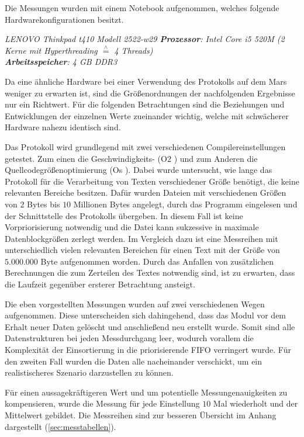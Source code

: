 \label{subCap:Messreihen}

Die Messungen wurden mit einem Notebook aufgenommen, welches
folgende Hardwarekonfigurationen besitzt.

\textit{
	LENOVO Thinkpad t410 Modell 2522-w29 \newline
	\textbf{Prozessor}: Intel Core i5 520M (2 Kerne mit Hyperthreading $\stackrel{\wedge}=$ 4 Threads)\\
	\textbf{Arbeitsspeicher}: 4 GB DDR3	
	}

Da eine ähnliche Hardware bei einer Verwendung des Protokolls auf dem Mars
weniger zu erwarten ist, sind die Größenordnungen der nachfolgenden Ergebnisse
nur ein Richtwert. Für die folgenden Betrachtungen sind die Beziehungen und
Entwicklungen der einzelnen Werte zueinander wichtig, welche mit schwächerer
Hardware nahezu identisch sind.

Das Protokoll wird grundlegend mit zwei verschiedenen
Compilereinstellungen getestet. Zum einen die Geschwindigkeits- (\glqq O$2$
\grqq) und zum Anderen die Quellcodegrößenoptimierung (\glqq Os \grqq). Dabei
wurde untersucht, wie lange das Protokoll für die Verarbeitung von Texten
verschiedener Größe benötigt, die keine relevanten Bereiche besitzen. Dafür
wurden Dateien mit verschiedenen Größen von $2$ Bytes bis $10$ Millionen Bytes 
angelegt, durch das Programm eingelesen und der Schnittstelle des Protokolls
übergeben. In diesem Fall ist keine Vorpriorisierung notwendig und die Datei
kann sukzessive in maximale Datenblockgrößen zerlegt werden.
Im Vergleich dazu ist eine Messreihen mit unterschiedlich vielen relevanten
Bereichen für einen Text mit der Größe von $5.000.000$ Byte aufgenommen
worden.
Durch das Anfallen von zusätzlichen Berechnungen die zum Zerteilen 
des Textes notwendig sind, ist zu erwarten, dass die Laufzeit gegenüber
ersterer Betrachtung ansteigt.

Die eben vorgestellten Messungen wurden auf zwei verschiedenen Wegen
aufgenommen. Diese unterscheiden sich dahingehend, dass das Modul vor dem Erhalt
neuer Daten gelöscht und anschließend neu erstellt wurde. Somit sind alle
Datenstrukturen bei jeden Messdurchgang leer, wodurch vorallem die Komplexität
der Einsortierung in die priorisierende \gls{FIFO} verringert wurde. Für den
zweiten Fall wurden die Daten alle nacheinander verschickt, um ein realistischeres
Szenario darzustellen zu können.

Für einen aussagekräftigeren Wert und um potentielle Messungenauigkeiten zu
kompensieren, wurde die Messung für jede Einstellung $10$ Mal wiederholt und der
Mittelwert gebildet. Die Messreihen sind zur besseren Übersicht im
Anhang dargestellt (\ref{sec:messtabellen}).